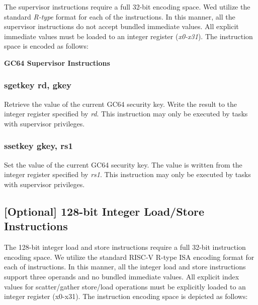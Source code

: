 \documentclass{article}
\begin{document}
The supervisor instructions require a full 32-bit encoding space.  Wed utilize
the standard \emph{R-type} format for each of the instructions.  In this manner, 
all the supervisor instructions do not accept bundled immediate values.  All
explicit immediate values must be loaded to an integer register (\emph{x0-x31}).
The instruction space is encoded as follows: 

\begin{center}
\textbf{GC64 Supervisor Instructions}
\makebox[0.03in][s]{}\makebox[0.03in][s]{}\makebox[0.03in][s]{}\makebox[0.03in][s]{}\makebox[0.03in][s]{}
\end{center}

\subsubsection{sgetkey rd, gkey}

Retrieve the value of the current GC64 security key.  Write
the result to the integer register specified by \emph{rd}.  This
instruction may only be executed by tasks with supervisor privileges. 

\subsubsection{ssetkey gkey, rs1}

Set the value of the current GC64 security key.  The value is written
from the integer register specified by \emph{rs1}.  This instruction
may only be executed by tasks with supervisor privileges.  

\subsection{[Optional] 128-bit Integer Load/Store Instructions}

The 128-bit integer load and store instructions require a full 32-bit instruction encoding space. We utilize the standard RISC-V R-type ISA encoding format for each of instructions. In this manner, all the integer load and store instructions support three operands and no bundled immediate values. All explicit index values for scatter/gather store/load operations must be explicitly loaded to an integer register (x0-x31).
The instruction encoding space is depicted as follows:
\end{document}
